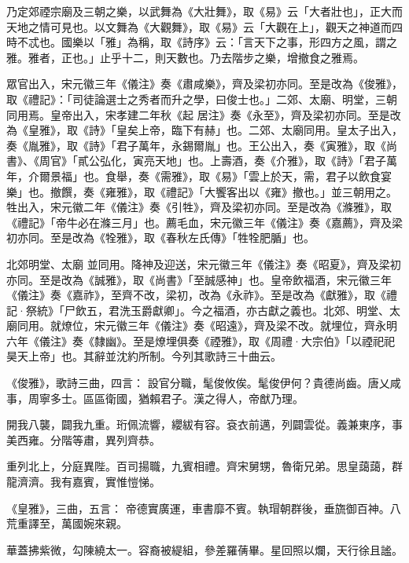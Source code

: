 \begin{pinyinscope}
 乃定郊禋宗廟及三朝之樂，以武舞為《大壯舞》，取《易》云「大者壯也」，正大而天地之情可見也。以文舞為《大觀舞》，取《易》云「大觀在上」，觀天之神道而四時不忒也。國樂以「雅」為稱，取《詩序》云：「言天下之事，形四方之風，謂之雅。雅者，正也。」止乎十二，則天數也。乃去階步之樂，增撤食之雅焉。



 眾官出入，宋元徽三年《儀注》奏《肅咸樂》，齊及梁初亦同。至是改為《俊雅》，取《禮記》：「司徒論選士之秀者而升之學，曰俊士也。」二郊、太廟、明堂，三朝同用焉。皇帝出入，宋孝建二年秋《起
 居注》奏《永至》，齊及梁初亦同。至是改為《皇雅》，取《詩》「皇矣上帝，臨下有赫」也。二郊、太廟同用。皇太子出入，奏《胤雅》，取《詩》「君子萬年，永錫爾胤」也。王公出入，奏《寅雅》，取《尚書》、《周官》「貳公弘化，寅亮天地」也。上壽酒，奏《介雅》，取《詩》「君子萬年，介爾景福」也。食舉，奏《需雅》，取《易》「雲上於天，需，君子以飲食宴樂」也。撤饌，奏《雍雅》，取《禮記》「大饗客出以《雍》撤也。」並三朝用之。牲出入，宋元徽二年《儀注》奏《引牲》，齊及梁初亦同。至是改為《滌雅》，取《禮記》「帝牛必在滌三月」也。薦毛血，宋元徽三年《儀注》奏《嘉薦》，齊及梁初亦同。至是改為《牷雅》，取《春秋左氏傳》「牲牷肥腯」也。



 北郊明堂、太廟
 並同用。降神及迎送，宋元徽三年《儀注》奏《昭夏》，齊及梁初亦同。至是改為《誠雅》，取《尚書》「至誠感神」也。皇帝飲福酒，宋元徽三年《儀注》奏《嘉祚》，至齊不改，梁初，改為《永祚》。至是改為《獻雅》，取《禮記·祭統》「尸飲五，君洗玉爵獻卿」。今之福酒，亦古獻之義也。北郊、明堂、太廟同用。就燎位，宋元徽三年《儀注》奏《昭遠》，齊及梁不改。就埋位，齊永明六年《儀注》奏《隸幽》。至是燎埋俱奏《禋雅》，取《周禮·大宗伯》「以禋祀祀昊天上帝」也。其辭並沈約所制。今列其歌詩三十曲云。



 《俊雅》，歌詩三曲，四言：
 設官分職，髦俊攸俟。髦俊伊何？貴德尚齒。唐乂咸事，周寧多士。區區衛國，猶賴君子。漢之得人，帝猷乃理。



 開我八襲，闢我九重。珩佩流響，纓紱有容。袞衣前邁，列闢雲從。義兼東序，事美西雍。分階等肅，異列齊恭。



 重列北上，分庭異陛。百司揚職，九賓相禮。齊宋舅甥，魯衛兄弟。思皇藹藹，群龍濟濟。我有嘉賓，實惟愷悌。



 《皇雅》，三曲，五言：
 帝德實廣運，車書靡不賓。執瑁朝群後，垂旒御百神。八荒重譯至，萬國婉來親。



 華蓋拂紫微，勾陳繞太一。容裔被緹組，參差羅蒨畢。星回照以爛，天行徐且謐。




\end{pinyinscope}
